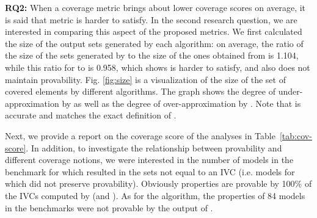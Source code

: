 \textbf{RQ2:} When a coverage metric brings about lower coverage scores on average,
it is said that metric is harder to satisfy. In the second research question,
we are interested in comparing this aspect of the proposed metrics.
We first calculated the size of the output sets generated by each algorithm: on average, the ratio of the size of the sets generated by \ucalg to the size of the ones obtained from \ucbfalg is 1.104, 
while this ratio for \mustalg to \ucbfalg is 0.958, which shows \mustalg is harder to satisfy, and also does not maintain provability. Fig. \ref{fig:size} is a visualization of the size of the set of covered elements by different algorithms. The graph shows the degree of under-approximation by \mustalg as well as the degree of over-approximation by \ucalg.
Note that \ucbfalg is accurate and matches the exact definition of \ivccov .

Next, we provide a report on the coverage score of the analyses in Table~\ref{tab:cov-score}. In addition, to investigate
the relationship between provability and different coverage notions,
we were interested in the number of models in the benchmark for which
\mustalg resulted in the sets not equal to an IVC (i.e. models for which
\mustalg did not preserve provability).
Obviously properties are provable by 100\% of the IVCs computed by \ucalg (and \ucbfalg).
As for the \mustalg algorithm, the properties of 84 models in the benchmarks were not provable by the output of \mustalg.


